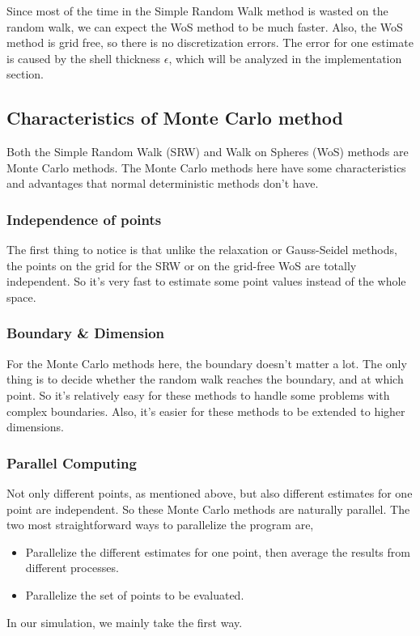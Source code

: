 \documentclass[aps, prl, preprint, groupedaddress]{revtex4-1}
\begin{document}
Since most of the time in the Simple Random Walk method is wasted on the random walk, we can expect the WoS method to be much faster. Also, the WoS method is grid free, so there is no discretization errors. The error for one estimate is caused by the shell thickness $\epsilon$, which will be analyzed in the implementation section.

\subsection{Characteristics of Monte Carlo method}

Both the Simple Random Walk (SRW) and Walk on Spheres (WoS) methods are Monte Carlo methods. The Monte Carlo methods here have some characteristics and advantages that normal deterministic methods don't have.

\subsubsection{Independence of points}

The first thing to notice is that unlike the relaxation or Gauss-Seidel methods, the points on the grid for the SRW or on the grid-free WoS are totally independent. So it's very fast to estimate some point values instead of the whole space.

\subsubsection{Boundary \& Dimension}

For the Monte Carlo methods here, the boundary doesn't matter a lot. The only thing is to decide whether the random walk reaches the boundary, and at which point. So it's relatively easy for these methods to handle some problems with complex boundaries. Also, it's easier for these methods to be extended to higher dimensions.

\subsubsection{Parallel Computing}

Not only different points, as mentioned above, but also different estimates for one point are independent. So these Monte Carlo methods are naturally parallel. The two most straightforward ways to parallelize the program are,
\begin{itemize}
    \item Parallelize the different estimates for one point, then average the results from different processes.
    \item Parallelize the set of points to be evaluated.
\end{itemize}
In our simulation, we mainly take the first way.
\end{document}
